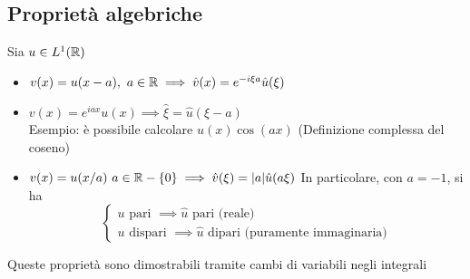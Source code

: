 \subsection{Proprietà algebriche}
Sia $u\in L^{1}(\mathbb{R})$ 
\begin{itemize}
	\item $v(x)=u(x-a), \ a\in \mathbb{R}\implies \hat{v}(x)=e^{-i\xi a}\hat{u}(\xi)$
	\item $v(x)=e^{iax}u(x)\implies \hat{\xi}=\hat{u}(\xi-a)$
\\		Esempio: è possibile calcolare $u(x)\cos(ax)$ (Definizione complessa del coseno)
\item $v(x)=u(x / a)\ a\in \mathbb{R}- \{0\} \implies \hat{v}(\xi)=|a|\hat{u}(a\xi)$
	In particolare, con $a=-1$, si ha
	\[\begin{cases}
		u\text{ pari }\implies \hat{u} \text{ pari (reale)}\\
		u\text{ dispari }\implies \hat{u}\text{ dipari (puramente immaginaria)}
	\end{cases}\]

\end{itemize}
Queste proprietà sono dimostrabili tramite cambi di variabili negli integrali
